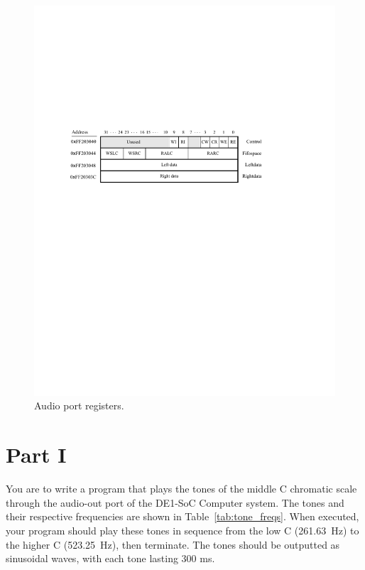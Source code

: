 \documentclass[epsfig,10pt,fullpage]{article}
\begin{document}
\begin{figure}[H]
   \begin{center}
       \includegraphics{figures/fig_audio_port.pdf}
   \end{center}
   \caption{Audio port registers.}
	\label{fig:audio_port}
\end{figure}

\noindent
\section*{Part I}

\noindent
You are to write a program that plays the tones of the middle C chromatic scale
through the audio-out port
of the DE1-SoC Computer system. The tones and their respective frequencies are shown in
Table~\ref{tab:tone_freqs}. When executed, your program should play these tones in sequence
from the low C (261.63~Hz) to the higher C (523.25~Hz), then terminate. The tones should be
outputted as sinusoidal waves, with each tone lasting 300 ms.
\end{document}
